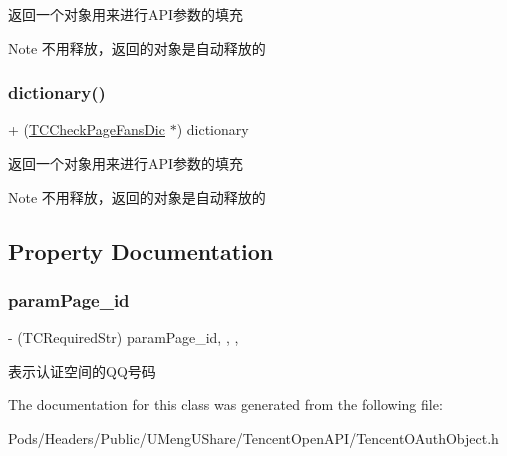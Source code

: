 返回一个对象用来进行\+A\+P\+I参数的填充

\begin{DoxyNote}{Note}
不用释放，返回的对象是自动释放的 
\end{DoxyNote}
\mbox{\label{interface_t_c_check_page_fans_dic_a7c143b4796a1d118fdd40006342d70ab}} 
\subsubsection{\texorpdfstring{dictionary()}{dictionary()}\hspace{0.1cm}{\footnotesize\ttfamily [2/2]}}
{\footnotesize\ttfamily + (\mbox{\hyperlink{interface_t_c_check_page_fans_dic}{T\+C\+Check\+Page\+Fans\+Dic}} $\ast$) dictionary \begin{DoxyParamCaption}{ }\end{DoxyParamCaption}}

返回一个对象用来进行\+A\+P\+I参数的填充

\begin{DoxyNote}{Note}
不用释放，返回的对象是自动释放的 
\end{DoxyNote}


\subsection{Property Documentation}
\mbox{\label{interface_t_c_check_page_fans_dic_a8d73f700b9cb0cfe6419cb4b2e9c50bb}} 
\subsubsection{\texorpdfstring{param\+Page\+\_\+id}{paramPage\_id}}
{\footnotesize\ttfamily -\/ (T\+C\+Required\+Str) param\+Page\+\_\+id\hspace{0.3cm}{\ttfamily [read]}, {\ttfamily [write]}, {\ttfamily [nonatomic]}, {\ttfamily [retain]}}

表示认证空间的\+Q\+Q号码 

The documentation for this class was generated from the following file\+:\begin{DoxyCompactItemize}
\item 
Pods/\+Headers/\+Public/\+U\+Meng\+U\+Share/\+Tencent\+Open\+A\+P\+I/Tencent\+O\+Auth\+Object.\+h\end{DoxyCompactItemize}
